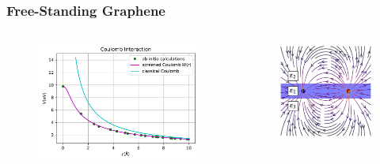 \documentclass{beamer}
\begin{document}

\begin{frame}
    \frametitle{Free-Standing Graphene}
    \begin{columns}
    \begin{figure}[H]
        \centering
        \includegraphics[width=\textwidth]{img/FSG_Cho_2018.pdf}
    \end{figure}
    \begin{figure}
        \centering
        \includegraphics[width=\textwidth]{img/FSG.pdf}

\end{figure}
\end{columns}
\end{frame}
\end{document}
